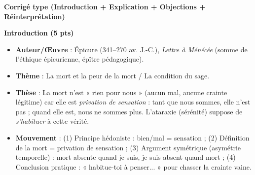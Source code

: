 \documentclass[11pt]{article}
\begin{document}
\begin{corrige}
\textbf{Corrigé type (Introduction + Explication + Objections + Réinterprétation)}

\textbf{Introduction (5 pts)}\par
\begin{itemize}
\item \textbf{Auteur/Œuvre} : Épicure (341–270 av. J.-C.), \emph{Lettre à Ménécée} (somme de l'éthique épicurienne, épître pédagogique).
\item \textbf{Thème} : La mort et la peur de la mort / La condition du sage.
\item \textbf{Thèse} : La mort n'est « rien pour nous » (aucun mal, aucune crainte légitime) car elle est \emph{privation de sensation} : tant que nous sommes, elle n'est pas ; quand elle est, nous ne sommes plus. L'ataraxie (sérénité) suppose de \emph{s'habituer} à cette vérité.
\item \textbf{Mouvement} : (1) Principe hédoniste : bien/mal = sensation ; (2) Définition de la mort = privation de sensation ; (3) Argument symétrique (asymétrie temporelle) : mort absente quand je suis, je suis absent quand mort ; (4) Conclusion pratique : « habitue-toi à penser... » pour chasser la crainte vaine.
\end{itemize}


\end{corrige}
\end{document}

